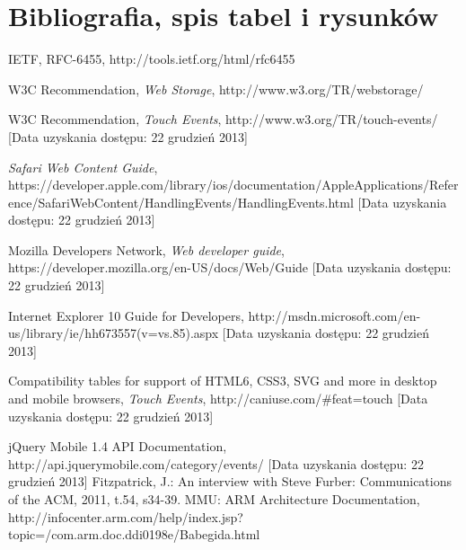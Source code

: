 \section{Bibliografia, spis tabel i rysunków}

\begin{thebibliography}{1}

   IETF, RFC-6455, http://tools.ietf.org/html/rfc6455
  
   W3C Recommendation, {\em Web Storage}, http://www.w3.org/TR/webstorage/
  
   W3C Recommendation, {\em Touch Events}, http://www.w3.org/TR/touch-events/ [Data uzyskania dostępu: 22 grudzień 2013]
  
   {\em Safari Web Content Guide}, https://developer.apple.com/library/ios/documentation/AppleApplications/Reference/SafariWebContent/HandlingEvents/HandlingEvents.html [Data uzyskania dostępu: 22 grudzień 2013]
  
   Mozilla Developers Network, {\em Web developer guide}, https://developer.mozilla.org/en-US/docs/Web/Guide [Data uzyskania dostępu: 22 grudzień 2013]
  
   Internet Explorer 10 Guide for Developers, http://msdn.microsoft.com/en-us/library/ie/hh673557(v=vs.85).aspx [Data uzyskania dostępu: 22 grudzień 2013]
 

   Compatibility tables for support of HTML6, CSS3, SVG and more in desktop and mobile browsers, {\em Touch Events}, http://caniuse.com/\#feat=touch [Data uzyskania dostępu: 22 grudzień 2013]
  
   jQuery Mobile 1.4 API Documentation, http://api.jquerymobile.com/category/events/ [Data uzyskania dostępu: 22 grudzień 2013]
  Fitzpatrick, J.: An interview with Steve Furber: Communications of the ACM, 2011, t.54, s34-39.
MMU: ARM Architecture Documentation, http://infocenter.arm.com/help/index.jsp?topic=/com.arm.doc.ddi0198e/Babegida.html


\end{thebibliography}
\listoftables

\listoffigures











